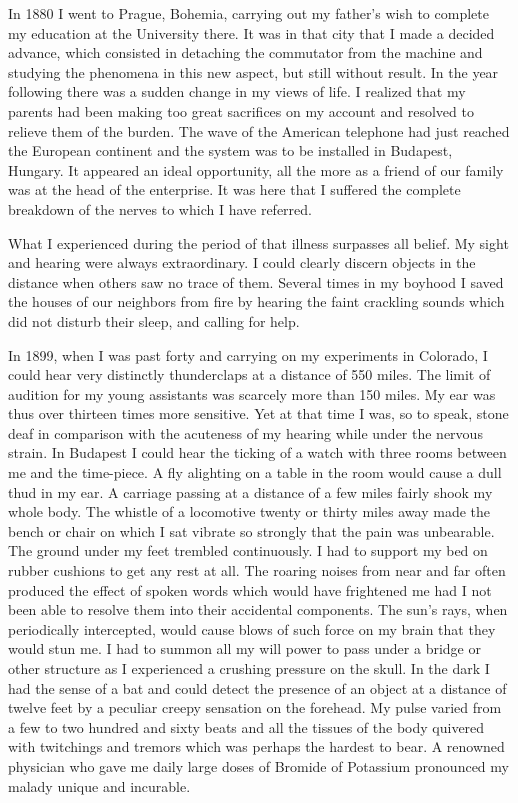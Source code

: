 \documentclass[a4paper,12pt,english,twoside,openright]{memoir}
\begin{document}
In 1880 I went to Prague, Bohemia, carrying out my father's wish to complete my education at the 
University there.  It was in that city that I made a decided advance, which consisted in detaching 
the commutator from the machine and studying the phenomena in this new aspect, but still 
without result.  In the year following there was a sudden change in my views of life.  I realized that 
my parents had been making too great sacrifices on my account and resolved to relieve them of 
the burden.  The wave of the American telephone had just reached the European continent and 
the system was to be installed in Budapest, Hungary.  It appeared an ideal opportunity, all the 
more as a friend of our family was at the head of the enterprise.  It was here that I suffered the 
complete breakdown of the nerves to which I have referred.  

What I experienced during the period of that illness surpasses all belief.  My sight and hearing 
were always extraordinary.  I could clearly discern objects in the distance when others saw no 
trace of them.  Several times in my boyhood I saved the houses of our neighbors from fire by 
hearing the faint crackling sounds which did not disturb their sleep, and calling for help.  

In 1899, when I was past forty and carrying on my experiments in Colorado, I could hear very 
distinctly thunderclaps at a distance of 550 miles.  The limit of audition for my young assistants 
was scarcely more than 150 miles.  My ear was thus over thirteen times more sensitive.  Yet at 
that time I was, so to speak, stone deaf in comparison with the acuteness of my hearing while 
under the nervous strain.  In Budapest I could hear the ticking of a watch with three rooms 
between me and the time-piece.  A fly alighting on a table in the room would cause a dull thud in 
my ear.  A carriage passing at a distance of a few miles fairly shook my whole body.  The whistle 
of a locomotive twenty or thirty miles away made the bench or chair on which I sat vibrate so 
strongly that the pain was unbearable.  The ground under my feet trembled continuously.  I had to 
support my bed on rubber cushions to get any rest at all.  The roaring noises from near and far 
often produced the effect of spoken words which would have frightened me had I not been able to 
resolve them into their accidental components.  The sun's rays, when periodically intercepted, 
would cause blows of such force on my brain that they would stun me.  I had to summon all my 
will power to pass under a bridge or other structure as I experienced a crushing pressure on the 
skull.  In the dark I had the sense of a bat and could detect the presence of an object at a 
distance of twelve feet by a peculiar creepy sensation on the forehead.  My pulse varied from a 
few to two hundred and sixty beats and all the tissues of the body quivered with twitchings and 
tremors which was perhaps the hardest to bear.  A renowned physician who gave me daily large 
doses of Bromide of Potassium pronounced my malady unique and incurable.  
\end{document}

